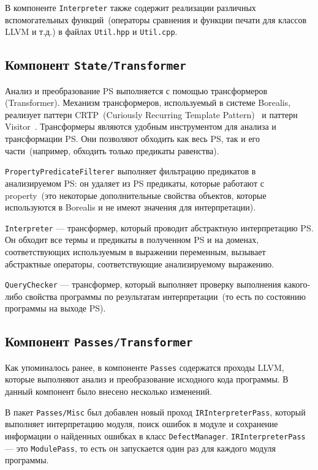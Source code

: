 В компоненте \texttt{Interpreter} также содержит реализации различных 
вспомогательных функций~(операторы сравнения и функции печати для классов LLVM
и т.д.) в файлах \texttt{Util.hpp} и \texttt{Util.cpp}.

\subsection{Компонент \texttt{State/Transformer}}
Анализ и преобразование PS выполняется с помощью трансфор­меров (Transformer). 
Механизм трансформеров, используемый в си­стеме Borealis, реализует паттерн 
CRTP~(Curiously Recurring Template Pattern)~\cite{crtp} и паттерн 
Visitor~\cite{visitor}. Трансформеры являются удобным инструментом для анализа 
и трансформации PS. Они позволяют об­ходить как весь PS, так и его 
части~(например, обходить только пре­дикаты равенства).

\texttt{PropertyPredicateFilterer} выполняет фильтрацию предикатов в 
анализируемом PS: он удаляет из PS предикаты, которые работают с property~(это
некоторые дополнительные свойства объектов, которые используются в Borealis и
не имеют значения для интерпретации).

\texttt{Interpreter} --- трансформер, который проводит абстрактную интерпретацию
PS. Он обходит все термы и предикаты в полученном PS и на доменах,
соответствующих используемым в выражении переменным, вызывает абстрактные 
операторы, соответствующие анализируемому выражению.

\texttt{QueryChecker} --- трансформер, который выполняет проверку выполнения
какого-либо свойства программы по результатам интерпретации~(то есть по 
состоянию программы на выходе PS).

\subsection{Компонент \texttt{Passes/Transformer}}
Как упоминалось ранее, в компоненте \texttt{Passes} содержатся проходы LLVM,
которые выполняют анализ и преобразование исходного кода программы. В данный
компонент было внесено несколько изменений.

В пакет \texttt{Passes/Misc} был добавлен новый проход
\texttt{IRInterpreterPass}, который выполняет интерпретацию модуля, поиск 
ошибок в модуле и сохранение информации о найденных ошибках в класс 
\texttt{DefectManager}. \texttt{IRInterpreterPass} --- это \texttt{ModulePass}, то есть он запускается один раз для каждого модуля программы.

